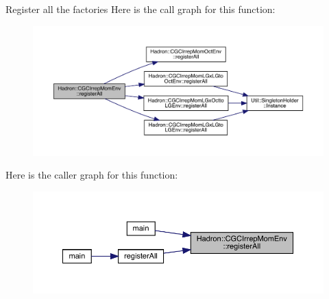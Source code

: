 Register all the factories Here is the call graph for this function\+:\nopagebreak
\begin{figure}[H]
\begin{center}
\leavevmode
\includegraphics[width=350pt]{d4/d33/namespaceHadron_1_1CGCIrrepMomEnv_af8421782c41f7dee9d5b4a17fc748862_cgraph}
\end{center}
\end{figure}
Here is the caller graph for this function\+:\nopagebreak
\begin{figure}[H]
\begin{center}
\leavevmode
\includegraphics[width=350pt]{d4/d33/namespaceHadron_1_1CGCIrrepMomEnv_af8421782c41f7dee9d5b4a17fc748862_icgraph}
\end{center}
\end{figure}
